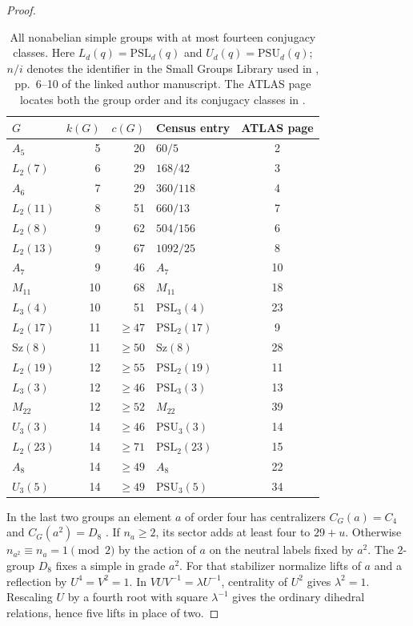 \documentclass[11pt]{amsart}
\numberwithin{equation}{section}
\theoremstyle{definition}
\theoremstyle{plain}
\begin{document}
\begin{proof}
\begin{table}[ht]
\centering\small
\begin{tabular}{lrrlc}
\toprule
$G$&$k(G)$&$c(G)$&Census entry \cite[\S4]{HM}&ATLAS page\\
\midrule
$A_5$&5&20&$60/5$&2\\
$L_2(7)$&6&29&$168/42$&3\\
$A_6$&7&29&$360/118$&4\\
$L_2(11)$&8&51&$660/13$&7\\
$L_2(8)$&9&62&$504/156$&6\\
$L_2(13)$&9&67&$1092/25$&8\\
$A_7$&9&46&$A_7$&10\\
$M_{11}$&10&68&$M_{11}$&18\\
$L_3(4)$&10&51&$\mathrm{PSL}_3(4)$&23\\
$L_2(17)$&11&$\ge47$&$\mathrm{PSL}_2(17)$&9\\
$\mathrm{Sz}(8)$&11&$\ge50$&$\mathrm{Sz}(8)$&28\\
$L_2(19)$&12&$\ge55$&$\mathrm{PSL}_2(19)$&11\\
$L_3(3)$&12&$\ge46$&$\mathrm{PSL}_3(3)$&13\\
$M_{22}$&12&$\ge52$&$M_{22}$&39\\
$U_3(3)$&14&$\ge46$&$\mathrm{PSU}_3(3)$&14\\
$L_2(23)$&14&$\ge71$&$\mathrm{PSL}_2(23)$&15\\
$A_8$&14&$\ge49$&$A_8$&22\\
$U_3(5)$&14&$\ge49$&$\mathrm{PSU}_3(5)$&34\\
\bottomrule
\end{tabular}
\caption{All nonabelian simple groups with at most fourteen conjugacy
classes. Here $L_d(q)=\mathrm{PSL}_d(q)$ and
$U_d(q)=\mathrm{PSU}_d(q)$; $n/i$ denotes the identifier in the Small
Groups Library used in \cite[\S4]{HM}, pp.~6--10 of the linked author manuscript. The ATLAS page locates both the
group order and its conjugacy classes in \cite{AtlasGroups}.}
\label{tab:simplecensus}
\end{table}

In the last two groups an element $a$ of order four has centralizers
$C_G(a)=C_4$ and $C_G(a^2)=D_8$ \cite{AtlasGroups}. If $n_a\ge2$,
its sector adds at least four to $29+u$. Otherwise $n_{a^2}\equiv n_a=1
\pmod2$ by the action of $a$ on the neutral labels fixed by $a^2$.
The $2$-group $D_8$ fixes a simple in grade $a^2$. For that stabilizer
normalize lifts of $a$ and a reflection by $U^4=V^2=1$.
In $VUV^{-1}=\lambda U^{-1}$, centrality of $U^2$ gives $\lambda^2=1$.
Rescaling $U$ by a fourth root with square $\lambda^{-1}$ gives the
ordinary dihedral relations, hence five lifts in place of two.
\end{proof}
\end{document}
